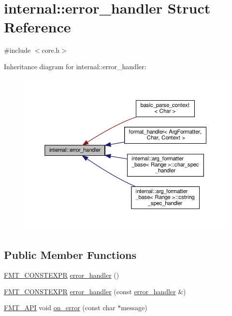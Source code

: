 \hypertarget{structinternal_1_1error__handler}{}\section{internal\+:\+:error\+\_\+handler Struct Reference}
\label{structinternal_1_1error__handler}


{\ttfamily \#include $<$core.\+h$>$}



Inheritance diagram for internal\+:\+:error\+\_\+handler\+:
\nopagebreak
\begin{figure}[H]
\begin{center}
\leavevmode
\includegraphics[width=350pt]{structinternal_1_1error__handler__inherit__graph}
\end{center}
\end{figure}
\subsection*{Public Member Functions}
\begin{DoxyCompactItemize}
\item 
\hyperlink{core_8h_a69201cb276383873487bf68b4ef8b4cd}{F\+M\+T\+\_\+\+C\+O\+N\+S\+T\+E\+X\+PR} \hyperlink{structinternal_1_1error__handler_a20cac4586ccce09e435ba4d25f08bf26}{error\+\_\+handler} ()
\item 
\hyperlink{core_8h_a69201cb276383873487bf68b4ef8b4cd}{F\+M\+T\+\_\+\+C\+O\+N\+S\+T\+E\+X\+PR} \hyperlink{structinternal_1_1error__handler_a76c57bba990794c50ef4a5eb2457708d}{error\+\_\+handler} (const \hyperlink{structinternal_1_1error__handler}{error\+\_\+handler} \&)
\item 
\hyperlink{core_8h_a9a4960b70582ed2620911a0b75dce0b5}{F\+M\+T\+\_\+\+A\+PI} void \hyperlink{structinternal_1_1error__handler_a46e83c008db275b6a59df9c650cec324}{on\+\_\+error} (const char $\ast$message)
\end{DoxyCompactItemize}


